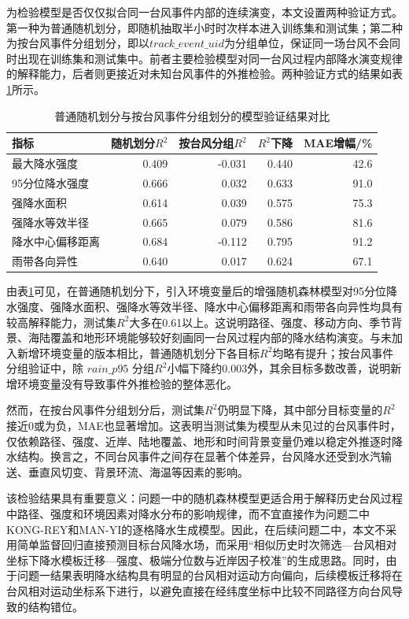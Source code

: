\documentclass[UTF8,a4paper,zihao=5,fontset=fandol]{ctexart}
\numberwithin{equation}{section}
\numberwithin{figure}{section}
\numberwithin{table}{section}
\begin{document}
为检验模型是否仅仅拟合同一台风事件内部的连续演变，本文设置两种验证方式。第一种为普通随机划分，即随机抽取半小时时次样本进入训练集和测试集；第二种为按台风事件分组划分，即以$track\_event\_uid$为分组单位，保证同一场台风不会同时出现在训练集和测试集中。前者主要检验模型对同一台风过程内部降水演变规律的解释能力，后者则更接近对未知台风事件的外推检验。两种验证方式的结果如表\ref{tab:random_vs_group_validation_problem1}所示。

\begin{table}[htbp]
    \centering
    \caption{普通随机划分与按台风事件分组划分的模型验证结果对比}
    \label{tab:random_vs_group_validation_problem1}
    \small
    \begin{tabular}{lrrrr}
        \hline
        指标 & 随机划分$R^2$ & 按台风分组$R^2$ & $R^2$下降 & MAE增幅/\% \\
        \hline
        最大降水强度 & 0.409 & -0.031 & 0.440 & 42.6 \\
        95分位降水强度 & 0.666 & 0.032 & 0.633 & 91.0 \\
        强降水面积 & 0.614 & 0.039 & 0.575 & 75.3 \\
        强降水等效半径 & 0.665 & 0.079 & 0.586 & 81.6 \\
        降水中心偏移距离 & 0.684 & -0.112 & 0.795 & 91.2 \\
        雨带各向异性 & 0.640 & 0.017 & 0.624 & 67.1 \\
        \hline
    \end{tabular}
\end{table}

由表\ref{tab:random_vs_group_validation_problem1}可见，在普通随机划分下，引入环境变量后的增强随机森林模型对95分位降水强度、强降水面积、强降水等效半径、降水中心偏移距离和雨带各向异性均具有较高解释能力，测试集$R^2$大多在0.61以上。这说明路径、强度、移动方向、季节背景、海陆覆盖和地形环境能够较好刻画同一台风过程内部的降水结构演变。与未加入新增环境变量的版本相比，普通随机划分下各目标$R^2$均略有提升；按台风事件分组验证中，除 $rain\_p95$ 分组$R^2$小幅下降约0.003外，其余目标多数改善，说明新增环境变量没有导致事件外推检验的整体恶化。

然而，在按台风事件分组划分后，测试集$R^2$仍明显下降，其中部分目标变量的$R^2$接近0或为负，MAE也显著增加。这表明当测试集为模型从未见过的台风事件时，仅依赖路径、强度、近岸、陆地覆盖、地形和时间背景变量仍难以稳定外推逐时降水结构。换言之，不同台风事件之间存在显著个体差异，台风降水还受到水汽输送、垂直风切变、背景环流、海温等因素的影响。

该检验结果具有重要意义：问题一中的随机森林模型更适合用于解释历史台风过程中路径、强度和环境因素对降水分布的影响规律，而不宜直接作为问题二中KONG-REY和MAN-YI的逐格降水生成模型。因此，在后续问题二中，本文不采用简单监督回归直接预测目标台风降水场，而采用“相似历史时次筛选—台风相对坐标下降水模板迁移—强度、极端分位数与近岸因子校准”的生成思路。同时，由于问题一结果表明降水结构具有明显的台风相对运动方向偏向，后续模板迁移将在台风相对运动坐标系下进行，以避免直接在经纬度坐标中比较不同路径方向台风导致的结构错位。
\end{document}
